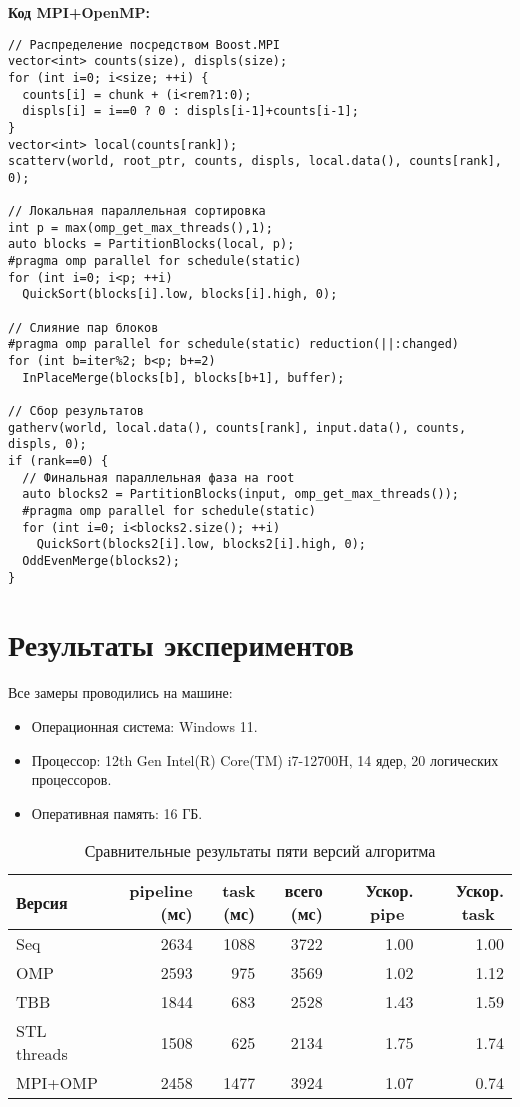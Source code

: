 \documentclass[12pt]{article}
\begin{document}
\noindent\textbf{Код MPI+OpenMP:}
\lstset{language=C++}
\begin{lstlisting}
// Распределение посредством Boost.MPI
vector<int> counts(size), displs(size);
for (int i=0; i<size; ++i) {
  counts[i] = chunk + (i<rem?1:0);
  displs[i] = i==0 ? 0 : displs[i-1]+counts[i-1];
}
vector<int> local(counts[rank]);
scatterv(world, root_ptr, counts, displs, local.data(), counts[rank], 0);

// Локальная параллельная сортировка
int p = max(omp_get_max_threads(),1);
auto blocks = PartitionBlocks(local, p);
#pragma omp parallel for schedule(static)
for (int i=0; i<p; ++i)
  QuickSort(blocks[i].low, blocks[i].high, 0);

// Слияние пар блоков
#pragma omp parallel for schedule(static) reduction(||:changed)
for (int b=iter%2; b<p; b+=2)
  InPlaceMerge(blocks[b], blocks[b+1], buffer);

// Сбор результатов
gatherv(world, local.data(), counts[rank], input.data(), counts, displs, 0);
if (rank==0) {
  // Финальная параллельная фаза на root
  auto blocks2 = PartitionBlocks(input, omp_get_max_threads());
  #pragma omp parallel for schedule(static)
  for (int i=0; i<blocks2.size(); ++i)
    QuickSort(blocks2[i].low, blocks2[i].high, 0);
  OddEvenMerge(blocks2);
}
\end{lstlisting}

\clearpage
\section{Результаты экспериментов}
\hspace*{1.25em}Все замеры проводились на машине:
\begin{itemize}
  \item Операционная система: Windows 11.
  \item Процессор: 12th Gen Intel(R) Core(TM) i7-12700H, 14 ядер, 20 логических процессоров.
  \item Оперативная память: 16 ГБ.
\end{itemize}

\begin{table}[htbp]
\centering
\caption{Сравнительные результаты пяти версий алгоритма}
\begin{tabular}{|l|r|r|r|r|r|}
\hline
\textbf{Версия} & \textbf{pipeline (мс)} & \textbf{task (мс)} & \textbf{всего (мс)} & \textbf{~Ускор. pipe~} & \textbf{~Ускор. task~} \\
\hline
Seq        & 2634 & 1088 & 3722 & 1.00  & 1.00  \\
OMP        & 2593 &  975 & 3569 & 1.02  & 1.12  \\
TBB        & 1844 &  683 & 2528 & 1.43  & 1.59  \\
STL threads& 1508 &  625 & 2134 & 1.75  & 1.74  \\
MPI+OMP    & 2458 & 1477 & 3924 & 1.07  & 0.74  \\
\hline
\end{tabular}
\label{tab:results}
\end{table}
\end{document}
